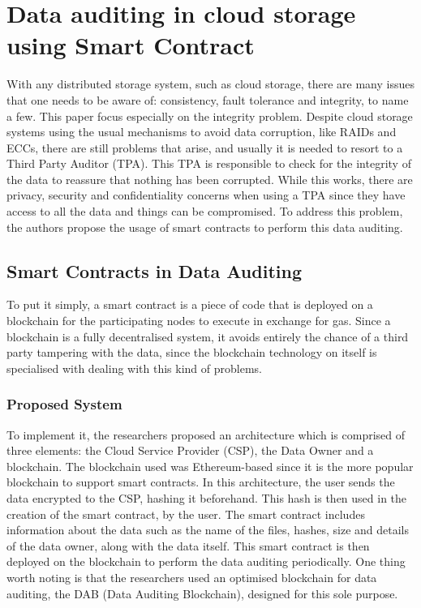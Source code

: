 \documentclass[14pt,oneside]{extreport}
\newcommand*\fpar{\hspace{1ex}}
\begin{document}
\chapter{Data auditing in cloud storage using Smart Contract \cite{paper4}}
\fpar With any distributed storage system, such as cloud storage, there are many issues that one needs to be aware of: consistency, fault tolerance and integrity, to name a few. This paper focus especially on the integrity problem. Despite cloud storage systems using the usual mechanisms to avoid data corruption, like RAIDs and ECCs, there are still problems that arise, and usually it is needed to resort to a Third Party Auditor (TPA). This TPA is responsible to check for the integrity of the data to reassure that nothing has been corrupted. While this works, there are privacy, security and confidentiality concerns when using a TPA since they have access to all the data and things can be compromised. To address this problem, the authors propose the usage of smart contracts to perform this data auditing.
\section{Smart Contracts in Data Auditing}
To put it simply, a smart contract is a piece of code that is deployed on a blockchain for the participating nodes to execute in exchange for gas. Since a blockchain is a fully decentralised system, it avoids entirely the chance of a third party tampering with the data, since the blockchain technology on itself is specialised with dealing with this kind of problems.
\subsection{Proposed System}
To implement it, the researchers proposed an architecture which is comprised of three elements: the Cloud Service Provider (CSP), the Data Owner and a blockchain. The blockchain used was Ethereum-based since it is the more popular blockchain to support smart contracts. In this architecture, the user sends the data encrypted to the CSP, hashing it beforehand. This hash is then used in the creation of the smart contract, by the user. The smart contract includes information about the data such as the name of the files, hashes, size and details of the data owner, along with the data itself. This smart contract is then deployed on the blockchain to perform the data auditing periodically. One thing worth noting is that the researchers used an optimised blockchain for data auditing, the DAB (Data Auditing Blockchain), designed for this sole purpose.
\end{document}
